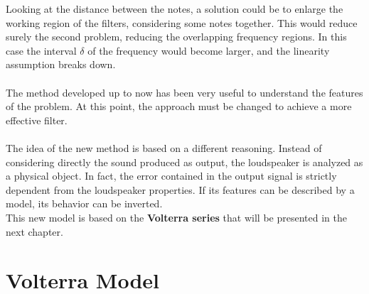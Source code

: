 Looking at the distance between the notes, a solution could be to enlarge the working region of the filters, considering some notes together.
This would reduce surely the second problem, reducing the overlapping frequency regions. In this case the interval $\delta$ of the frequency would become larger, and the linearity assumption breaks down.\\\\
The method developed up to now has been very useful to understand the features of the problem. At this point, the approach must be changed to achieve a more effective filter.\\\\
The idea of the new method is based on a different reasoning. Instead of considering directly the sound produced as output, the loudspeaker is analyzed as a physical object. In fact, the error contained in the output signal is strictly dependent from the loudspeaker properties. If its features can be described by a model, its behavior can be inverted.\\
This new model is based on the \textbf{Volterra series} that will be presented in the next chapter.

\chapter{Volterra Model}
